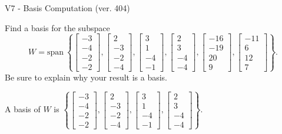 \begin{exercise}
  \begin{exerciseTitle}V7 - Basis Computation (ver. 404)\end{exerciseTitle}
  \begin{exerciseStatement}
    Find a basis for the subspace 
\[W=\mathrm{span}\ \left\{\left[\begin{array}{r}
-3 \\
-4 \\
-2 \\
-2
\end{array}\right] , \left[\begin{array}{r}
2 \\
-3 \\
-2 \\
-4
\end{array}\right] , \left[\begin{array}{r}
3 \\
1 \\
-4 \\
-1
\end{array}\right] , \left[\begin{array}{r}
2 \\
3 \\
-4 \\
-4
\end{array}\right] , \left[\begin{array}{r}
-16 \\
-19 \\
20 \\
9
\end{array}\right] , \left[\begin{array}{r}
-11 \\
6 \\
12 \\
7
\end{array}\right]\right\}.\]
 Be sure to explain why your result is a basis.


  \end{exerciseStatement}
  \begin{exerciseAnswer}
   A basis of \(W\) is  \(\left\{\left[\begin{array}{r}
-3 \\
-4 \\
-2 \\
-2
\end{array}\right] , \left[\begin{array}{r}
2 \\
-3 \\
-2 \\
-4
\end{array}\right] , \left[\begin{array}{r}
3 \\
1 \\
-4 \\
-1
\end{array}\right] , \left[\begin{array}{r}
2 \\
3 \\
-4 \\
-4
\end{array}\right]\right\}\).
  


  \end{exerciseAnswer}
\end{exercise}